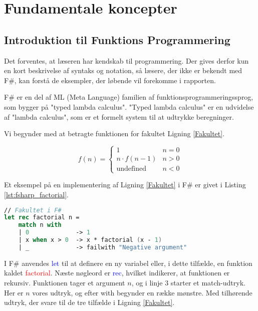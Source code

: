 
\section{Fundamentale koncepter}
\subsection{Introduktion til Funktions Programmering}
Det forventes, at læseren har kendskab til programmering. Der gives derfor kun en kort beskrivelse af syntaks og notation, så læsere, der ikke er bekendt med F\#, kan forstå de eksempler, der løbende vil forekomme i rapporten. 

F\# er en del af ML (Meta Language) familien af funktionsprogrammeringssprog, som bygger på "typed lambda calculus". "Typed lambda calculus" er en udvidelse af "lambda calculus", som er et formelt system til at udtrykke beregninger.


Vi begynder med at betragte funktionen for fakultet Ligning \eqref{Fakultet}.

\begin{equation}
    \label{Fakultet}
    f(n) = \begin{cases} 
            1 &  n = 0  \\
            n \cdot f(n-1) & n > 0 \\
            \text{undefined} & n < 0 
           \end{cases}
\end{equation}

Et eksempel på en implementering af Ligning \eqref{Fakultet} i F\# er givet i Listing \ref{lst:fsharp_factorial}.

\begin{lstlisting}[language={FSharp}, label={lst:fsharp_factorial}, caption={Eksempel på Fakultet i F\#}]
// Fakultet i F#
let rec factorial n =
    match n with
    | 0             -> 1 
    | x when x > 0  -> x * factorial (x - 1)
    | _             -> failwith "Negative argument"
\end{lstlisting}

I F\# anvendes \textcolor{blue}{let} til at definere en ny variabel eller, i dette tilfælde, en funktion kaldet \textcolor{red}{factorial}. Næste nøgleord er \textcolor{blue}{rec}, hvilket indikerer, at funktionen er rekursiv. Funktionen tager et argument \(n\), og i linje 3 starter et match-udtryk. Her er \(n\) vores udtryk, og efter \textcolor{codepurple}{with} begynder en række mønstre. Med tilhørende udtryk, der svare til de tre tilfælde i Ligning \eqref{Fakultet}. 
    
